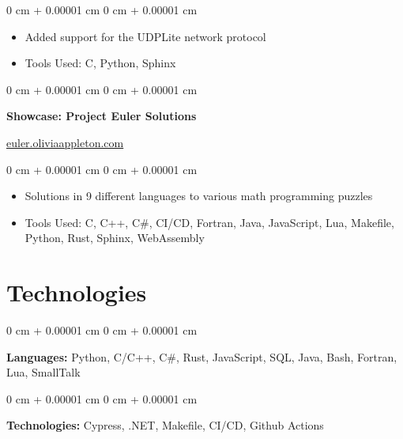 \documentclass[10pt, letterpaper]{article}
\newenvironment{highlights}{
    \begin{itemize}[
        topsep=0.10 cm,
        parsep=0.10 cm,
        partopsep=0pt,
        itemsep=0pt,
        leftmargin=0 cm + 10pt
    ]
}{
    \end{itemize}
} %
\newenvironment{onecolentry}{
    \begin{adjustwidth}{
        0 cm + 0.00001 cm
    }{
        0 cm + 0.00001 cm
    }
}{
    \end{adjustwidth}
} %
\newenvironment{twocolentry}[2][]{
    \onecolentry
    \def\secondColumn{#2}
    \setcolumnwidth{\fill, 4.5 cm}
    \begin{paracol}{2}
}{
    \switchcolumn \raggedleft \secondColumn
    \end{paracol}
    \endonecolentry
} %
\begin{document}
        \begin{onecolentry}
            \begin{highlights}
                \item Added support for the UDPLite network protocol
                \item Tools Used: C, Python, Sphinx
            \end{highlights}
        \end{onecolentry}

        \vspace{0.1 cm}

        \begin{twocolentry}{
            \href{https://euler.oliviaappleton.com}{euler.oliviaappleton.com}
        }
            \textbf{Showcase: Project Euler Solutions}
        \end{twocolentry}

        \begin{onecolentry}
            \begin{highlights}
                \item Solutions in 9 different languages to various math programming puzzles
                \item Tools Used: C, C+\!+, C\#, CI/CD, Fortran, Java, JavaScript, Lua, Makefile, Python, Rust, Sphinx, WebAssembly
            \end{highlights}
        \end{onecolentry}

    \vspace{-5pt}

    \section{Technologies}

        \begin{onecolentry}
            \textbf{Languages:} Python, C/C+\!+, C\#, Rust, JavaScript, SQL, Java, Bash, Fortran, Lua, SmallTalk
        \end{onecolentry}

        \begin{onecolentry}
            \textbf{Technologies:} Cypress, .NET, Makefile, CI/CD, Github Actions
        \end{onecolentry}
\end{document}
